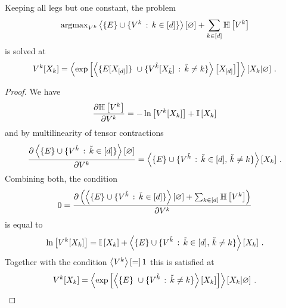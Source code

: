 \begin{theorem}
	Keeping all legs but one constant, the problem
	\begin{align*}
		\mathrm{argmax}_{V^{k}} \left\langle \{E\} \cup \{V^{k} \, : \, k\in[d]\}\right\rangle \left[ \varnothing \right]
		+ \sum_{k\in[d]} \mathbb{H}\left[V^{k}\right] 
	\end{align*}
	is solved at 
		\[ \legcoreofat{\catenumerator}{\catvariableof{\catenumerator}} 
			= \normationof{ \expof{ \contractionof{ \{\energytensor[\shortcatvariables] \} \cup
				\{\legcoreofat{\seccatenumerator}{\catvariableof{\seccatenumerator}} \, : \, \seccatenumerator\neq\catenumerator\} }{\shortcatvariables} }
			}{\catvariableof{\catenumerator}} \, . \]
\end{theorem}
\begin{proof}
	We have
	\begin{align*}
		 \frac{\partial \mathbb{H}\left[V^{k}\right]}{\partial V^{k}}
		=  - \ln \left[ V^{k}[X_{k}] \right]
		+ \mathbb{I}\left[X_{k}\right]
	\end{align*}
	and by multilinearity of tensor contractions
	\begin{align*}
		\frac{\partial \left\langle \{E\}\cup\{V^{\tilde{k}} \, : \, \tilde{k}\in[d] \}\right\rangle \left[ \varnothing \right]}{\partial V^{k}}
		=  \left\langle \{E\}\cup\{V^{\tilde{k}} \, : \, \tilde{k}\in[d] ,\, \tilde{k}\neq k \}\right\rangle \left[ X_{k} \right] \, . 
	\end{align*}
	Combining both, the condition
	\begin{align*}
		0 = \frac{\partial 
			\left( \left\langle \{E\}\cup\{V^{\tilde{k}} \, : \, \tilde{k}\in[d] \}\right\rangle \left[ \varnothing \right] + \sum_{k\in[d]} \mathbb{H}\left[V^{k}\right] \right)
		}{\partial V^{k}}
	\end{align*}
	is equal to
	\begin{align*}
		\ln \left[ V^{k}[X_{k}] \right] =
		 \mathbb{I}\left[X_{k}\right] + \left\langle \{E\}\cup\{V^{\tilde{k}} \, : \, \tilde{k}\in[d] ,\, \tilde{k}\neq k \}\right\rangle \left[ X_{k} \right] \, .
	\end{align*}
	Together with the condition $\left\langle V^{k}\right\rangle \left[ = \right]1$ this is satisfied at
		\[ \legcoreofat{\catenumerator}{\catvariableof{\catenumerator}} 
			= \normationof{ \expof{ \contractionof{ \{\energytensor\} \cup
				\{\legcoreof{\seccatenumerator} \, : \, \seccatenumerator\neq\catenumerator\} }{\catvariableof{\catenumerator}} }
			}{\catvariableof{\catenumerator}} \, . \]
\end{proof}



